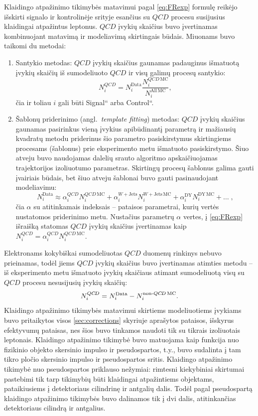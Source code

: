 \documentclass[a4paper, 12pt, oneside]{article}
\newcommand{\WJets}{W\! +\!\mathrm{Jets}}
\newcommand{\ltq}[1]{{\quotedblbase{}#1\textquotedblleft{}}}
\newcommand{\QCD}{QC\! D}
\newlength\q
\begin{document}
Klaidingo atpažinimo tikimybės matavimui pagal \eqref{eq:FRexp} formulę reikėjo išskirti signalo ir kontrolinėje srityje esančius
su $\QCD$ procesu susijusius klaidingai atpažintus leptonus.
$\QCD$ įvykių skaičius buvo įvertinamas kombinuojant matavimą ir modeliavimą skirtingais būdais.
Miuonams buvo taikomi du metodai:
\begin{enumerate}
	\item Santykio metodas: $\QCD$ įvykių skaičius gaunamas padauginus išmatuotą įvykių skaičių iš sumodeliuoto $\QCD$ ir visų
	galimų procesų santykio: $$N_i^{\QCD}=N_i^{\mathrm{Data}} \frac{N_i^{\QCD \, \mathrm{MC}}}{N_i^{\mathrm{All \, MC}}},$$
	čia ir toliau $i$ gali būti \ltq{Signal} arba \ltq{Control}.
	\item Šablonų priderinimo (angl.\ \textit{template fitting}) metodas: $\QCD$ įvykių skaičius gaunamas pasirinkus vieną
	įvykius apibūdinantį parametrą ir mažiausių kvadratų metodu priderinus šio parametro pasiskirstymus skirtingiems procesams
	(šablonus) prie eksperimento metu išmatuoto pasiskirstymo.
	Šiuo atveju buvo naudojamas dalelių srauto algoritmo apskaičiuojamas trajektorijos izoliuotumo parametras.
	Skirtingų procesų šablonus galima gauti įvairiais būdais, bet šiuo atveju šablonai buvo gauti pasinaudojant modeliavimu:
	$$N_i^{\mathrm{Data}} \approx \alpha_i^{\QCD} N_i^{\QCD \, \mathrm{MC}} + \alpha_i^{\WJets} N_i^{\WJets \, \mathrm{MC}} +
	\alpha_i^{\mathrm{DY}} N_i^{\mathrm{DY \, MC}} + \dots \;,$$
	čia $\alpha$ su atitinkamais indeksais -- pataisos parametrai, kurių vertės nustatomos priderinimo metu.
	Nustačius parametrų $\alpha$ vertes, į \eqref{eq:FRexp} išraišką statomas $\QCD$ įvykių skaičius įvertinamas kaip
	$N_i^{\QCD} = \alpha_i^{\QCD} N_i^{\QCD \, \mathrm{MC}}$.
\end{enumerate}

Elektronams kokybiškai sumodeliuotas $\QCD$ duomenų rinkinys nebuvo prieinamas, todėl jiems $\QCD$ įvykių skaičius buvo
įvertinamas atimties metodu -- iš eksperimento metu išmatuoto įvykių skaičiaus atimant sumodeliuotą visų su $\QCD$ procesu
nesusijusių įvykių skaičių:
$$N_i^{\QCD} = N_i^{\mathrm{Data}} - N_i^{\mathrm{non}{\text -}\QCD \, \mathrm{MC}}.$$
Klaidingo atpažinimo tikimybės matavimui skirtiems modeliuotiems įvykiams buvo pritaikytos visos \ref{sec:corrections}
skyriuje aprašytos pataisos, išskyrus efektyvumų pataisas, nes šios buvo tinkamos  naudoti tik su tikrais izoliuotais leptonais.
Klaidingo atpažinimo tikimybė buvo matuojama kaip funkcija nuo fizikinio objekto skersinio impulso ir pseudospartos,
t.y., buvo sudalinta į tam tikro pločio skersinio impulso ir pseudospartos sritis.
Klaidingo atpažinimo tikimybė nuo pseudospartos priklauso nežymiai: rimtesni kiekybiniai skirtumai pastebimi tik
tarp tikimybių būti klaidingai atpažintiems objektams, pataikiusiems į detektoriaus cilindrinę ir antgalių dalis.
Todėl pagal pseudospartą klaidingo atpažinimo tikimybės buvo dalinamos tik į dvi dalis, atitinkančias detektoriaus cilindrą
ir antgalius.
\end{document}
